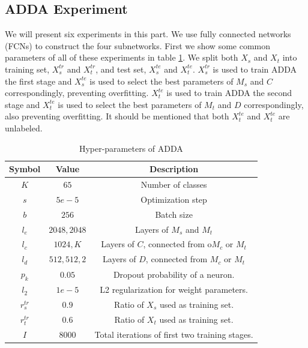 \documentclass[conference]{IEEEtran}
\begin{document}
\subsection{ADDA Experiment}
We will present six experiments in this part. We use fully connected networks (FCNs) to construct the four subnetworks. First we show some common parameters of all of these experiments in table \ref{tab:SymADDA}. We split both $X_s$ and $X_t$ into training set, $X^{tr}_s$ and $X^{tr}_t$, and test set, $X^{te}_s$ and $X^{te}_t$. $X^{tr}_s$ is used to train ADDA the first stage and $X^{te}_s$ is used to select the best parameters of $M_s$ and $C$ correspondingly, preventing overfitting. $X^{te}_t$ is used to train ADDA the second stage and $X^{te}_t$ is used to select the best parameters of $M_t$ and $D$ correspondingly, also preventing overfitting. It should be mentioned that both $X^{te}_t$ and $X^{te}_t$ are unlabeled.
 \begin{table}[h]
	\centering
	\caption{Hyper-parameters of ADDA}
	\label{tab:SymADDA}
	\begin{tabular}{ccc}
		\hline
		Symbol & Value & Description \\
		\hline
		\hline
        $K$ & $65$ & Number of classes \\
		$s$ & $5e-5$ & Optimization step \\
		$b$ & $256$ & Batch size \\
		$l_e$ & ${2048,2048}$ & Layers of $M_s$ and $M_t$ \\
		$l_c$ & ${1024,K}$ & Layers of $C$, connected from o$M_c$ or $M_t$  \\
		$l_d$ & ${512,512,2}$ & Layers of $D$, connected from $M_c$ or $M_t$ \\
        $p_k$ & $0.05$ & Dropout probability of a neuron. \\
        $l_2$ & $1e-5$ & L2 regularization for weight parameters.  \\
        $r^{tr}_{s}$ & $0.9$ & Ratio of $X_s$ used as training set.\\
        $r^{tr}_{t}$ & $0.6$ & Ratio of $X_t$ used as training set.  \\
        $I$ & $8000$ & Total iterations of first two training stages.   \\
		\hline
	\end{tabular}
\end{table}
\end{document}
